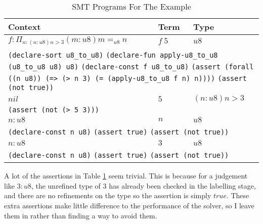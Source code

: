 \begin{table}
    \centering
    \begin{tabular}{|l|l|l|}
        \hline
        \textbf{Context} & \textbf{Term} & \textbf{Type}\\\hline
        $f: \Pi_{n: (n:u8) n > 3} (m: u8) m =_{u8} n$ & $f\ 5$ & $u8$\\\hline
        \multicolumn{3}{|p{1.0\textwidth}|}{
            \texttt{(declare-sort u8\_to\_u8)}\newline
            \texttt{(declare-fun apply-u8\_to\_u8 (u8\_to\_u8 u8) u8)}\newline
            \texttt{(declare-const f u8\_to\_u8)}\newline
            \texttt{(assert (forall ((n u8)) (=> (> n 3) (= (apply-u8\_to\_u8 f n) n))))}\newline
            \texttt{(assert (not true))}
        }\\\hline
        $nil$ & $5$ & $(n: u8) n > 3$\\\hline
        \multicolumn{3}{|p{1.0\textwidth}|}{
            \texttt{(assert (not (> 5 3)))}
        }\\\hline
        $n: u8$ & $n$ & $u8$\\\hline
        \multicolumn{3}{|p{1.0\textwidth}|}{
            \texttt{(declare-const n u8)}\newline
            \texttt{(assert true)}\newline
            \texttt{(assert (not true))}
        }\\\hline
        $n: u8$ & $3$ & $u8$\\\hline
        \multicolumn{3}{|p{1.0\textwidth}|}{
            \texttt{(declare-const n u8)}\newline
            \texttt{(assert true)}\newline
            \texttt{(assert (not true))}
        }\\\hline
    \end{tabular}
    \caption{SMT Programs For The Example}
    \label{tab:example_smt}
\end{table}
A lot of the assertions in Table \ref{tab:example_smt} seem trivial.
This is because for a judgement like $3:u8$, the unrefined type of $3$ has already been checked in
the labelling stage, and there are no refinements on the type so the assertion is simply $true$.
These extra assertions make little difference to the performance of the solver, so I leave them
in rather than finding a way to avoid them.

